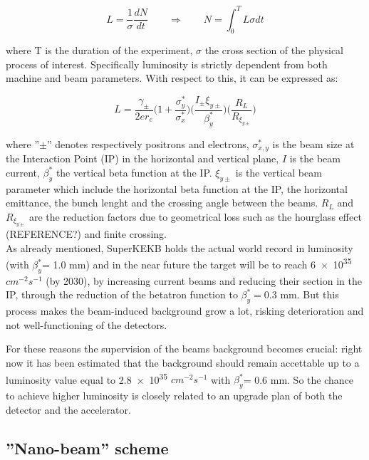 \begin{equation}
L =\frac{1}{\sigma}\frac{dN}{dt}  \qquad   \Rightarrow \qquad  N = \int_{0}^{T} L\sigma dt
\end{equation}

where T is the duration of the experiment,  $\sigma$ the cross section of the physical process of interest.
Specifically luminosity is strictly dependent from both machine and beam parameters. With respect to this, it can be expressed as:

\begin{equation} \label{eq:luminosity_eq}
L = \frac{\gamma_{\pm}}{2er_{e}} \bigg(1 + \frac{\sigma_{y}^{*}}{\sigma_{x}^{*}} \bigg) \bigg(\frac{I_{\pm}\xi_{y\pm}}{\beta^{*}_{y}} \bigg) \bigg(\frac{R_{L}}{R_{\xi_{y\pm}}} \bigg)
\end{equation}

where ''$\pm$'' denotes respectively positrons and electrons, $\sigma_{x,y}^{*}$ is the beam size at the Interaction Point (IP) in the horizontal and vertical plane, $I$ is the beam current, $\beta_{y}^{*}$ the vertical beta function at the IP. $\xi_{y\pm}$ is the vertical beam parameter which include the horizontal beta function at the IP, the horizontal emittance, the bunch lenght and the crossing angle between the beams. $R_{L}$ and $R_{\xi_{y\pm}}$ are the reduction factors due to geometrical loss such as the hourglass effect (REFERENCE?) and finite crossing.\\

As already mentioned, SuperKEKB holds the actual world record in luminosity (with $\beta^{*}_{y}$= 1.0 mm) and in the near future the target will be to reach \num{6e35} $cm^{-2} s^{-1}$ (by 2030), by increasing current beams and reducing their section in the IP, through the reduction of the betatron function to $\beta^{*}_{y}= 0.3$ mm. But this process makes the beam-induced background grow a lot, risking deterioration and not well-functioning of the detectors.

For these reasons the supervision of the beams background becomes crucial: right now it has been estimated that the background should remain accettable up to a luminosity value equal to \num{2.8e35} $cm^{-2} s^{-1}$ with $\beta^{*}_{y}$= 0.6 mm.
So the chance to achieve higher luminosity is closely related to an upgrade plan of both the detector and the accelerator.


\subsection{''Nano-beam'' scheme} \label{nano_beam}

